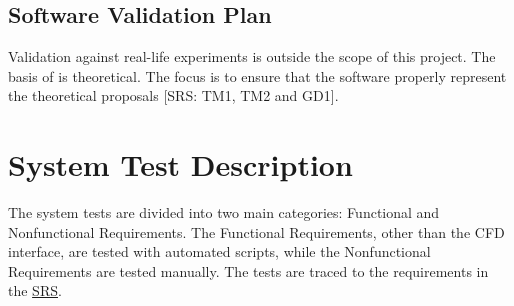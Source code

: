 \documentclass[12pt, titlepage]{article}
\begin{document}

\subsection{Software Validation Plan}

Validation against real-life experiments is outside the scope of this project. The basis of \progname{} is theoretical. The focus is to ensure that the software properly represent the theoretical proposals [SRS: TM1, TM2 and GD1].






\newpage
\section{System Test Description}

The system tests are divided into two main categories: Functional and Nonfunctional Requirements. The Functional Requirements, other than the CFD interface, are tested with automated scripts, while the Nonfunctional Requirements are tested manually. The tests are traced to the requirements in the \href{https://github.com/omltcat/turbulent-flow/blob/main/docs/SRS/SRS.pdf}{SRS}.
	
\end{document}
